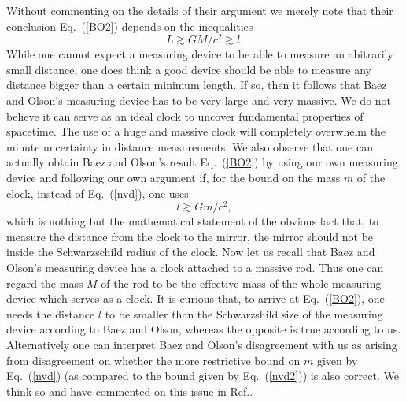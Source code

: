 \documentclass[preprint2]{aastex}
\begin{document}
Without commenting on the details of their argument we merely note that
their conclusion Eq.~(\ref{BO2}) depends on the inequalities
\begin{equation}
L \gtrsim GM/c^2 \gtrsim l.
\label{inequal}
\end{equation}
While one cannot expect a measuring device to be able to measure an
abitrarily small distance, one does think a good device should be able to
measure any distance bigger than a certain minimum length.  If so, then
it follows that Baez and Olson's measuring device has to be very large and
very massive.  We do not believe it can serve as an ideal clock to uncover
fundamental properties of spacetime.  The use of a huge and
massive clock will completely overwhelm the minute uncertainty in distance
measurements.  We also observe \citep{ngy00a}
that one can actually obtain Baez and
Olson's result Eq.~(\ref{BO2}) by using our own measuring device
and following our own argument if, for
the
bound on the mass $m$ of the clock, instead of Eq.~(\ref{nvd}), one uses
\begin{equation}
l \gtrsim Gm/c^2,
\label{nvd2}
\end{equation}
which is nothing but the mathematical statement of the obvious fact that,
to measure the distance from the clock to the mirror, the mirror should
not be inside the Schwarzschild radius of the clock.  Now let us recall
that Baez and Olson's measuring device has a clock attached to a massive
rod.  Thus one can regard the mass $M$ of the rod to be the effective mass
of the whole measuring device which serves as a clock.  It is curious that,
to arrive at Eq.~(\ref{BO2}), one needs the distance $l$ to be smaller
than the Schwarzshild size of the measuring device according to Baez and
Olson, whereas the opposite is true according to us.
Alternatively one can interpret Baez and Olson's disagreement with us
as arising from disagreement on whether the more restrictive bound
on $m$ given by Eq.~(\ref{nvd}) (as compared to the bound given by
Eq.~(\ref{nvd2})) is also correct.  We think so and have commented on this
issue in Ref.\citep{ngy00a}.
\end{document}
